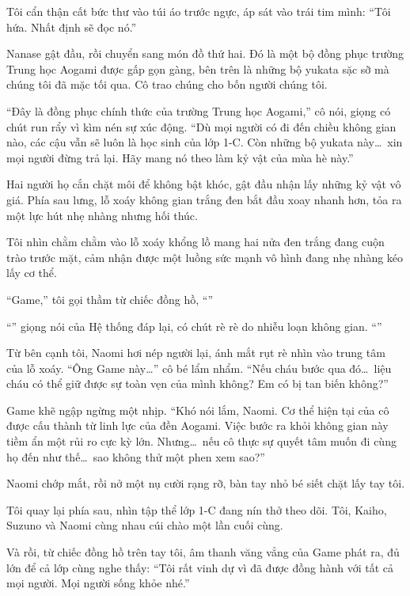 \documentclass[../main.tex]{subfiles}
\begin{document}
Tôi cẩn thận cất bức thư vào túi áo trước ngực, áp sát vào trái tim mình: ``Tôi hứa. Nhất định sẽ đọc nó.''

Nanase gật đầu, rồi chuyển sang món đồ thứ hai. Đó là một bộ đồng phục trường Trung học Aogami được gấp gọn gàng, bên trên là những bộ yukata sặc sỡ mà chúng tôi đã mặc tối qua. Cô trao chúng cho bốn người chúng tôi.

``Đây là đồng phục chính thức của trường Trung học Aogami,'' cô nói, giọng có chút run rẩy vì kìm nén sự xúc động. ``Dù mọi người có đi đến chiều không gian nào, các cậu vẫn sẽ luôn là học sinh của lớp 1-C. Còn những bộ yukata này\dots\ xin mọi người đừng trả lại. Hãy mang nó theo làm kỷ vật của mùa hè này.''

Hai người họ cắn chặt môi để không bật khóc, gật đầu nhận lấy những kỷ vật vô giá. Phía sau lưng, lỗ xoáy không gian trắng đen bắt đầu xoay nhanh hơn, tỏa ra một lực hút nhẹ nhàng nhưng hối thúc.

Tôi nhìn chằm chằm vào lỗ xoáy khổng lồ mang hai nửa đen trắng đang cuộn trào trước mặt, cảm nhận được một luồng sức mạnh vô hình đang nhẹ nhàng kéo lấy cơ thể.

``Game,'' tôi gọi thầm từ chiếc đồng hồ, ``''

``'' giọng nói của Hệ thống đáp lại, có chút rè rè do nhiễu loạn không gian. ``''

Từ bên cạnh tôi, Naomi hơi nép người lại, ánh mắt rụt rè nhìn vào trung tâm của lỗ xoáy. ``Ông Game này\dots'' cô bé lẩm nhẩm. ``Nếu cháu bước qua đó\dots\ liệu cháu có thể giữ được sự toàn vẹn của mình không? Em có bị tan biến không?''

Game khẽ ngập ngừng một nhịp. ``Khó nói lắm, Naomi. Cơ thể hiện tại của cô được cấu thành từ linh lực của đền Aogami. Việc bước ra khỏi không gian này tiềm ẩn một rủi ro cực kỳ lớn. Nhưng\dots\ nếu cô thực sự quyết tâm muốn đi cùng họ đến như thế\dots\ sao không thử một phen xem sao?''

Naomi chớp mắt, rồi nở một nụ cười rạng rỡ, bàn tay nhỏ bé siết chặt lấy tay tôi.

Tôi quay lại phía sau, nhìn tập thể lớp 1-C đang nín thở theo dõi. Tôi, Kaiho, Suzuno và Naomi cùng nhau cúi chào một lần cuối cùng.

Và rồi, từ chiếc đồng hồ trên tay tôi, âm thanh văng vẳng của Game phát ra, đủ lớn để cả lớp cùng nghe thấy: ``Tôi rất vinh dự vì đã được đồng hành với tất cả mọi người. Mọi người sống khỏe nhé.''
\end{document}
